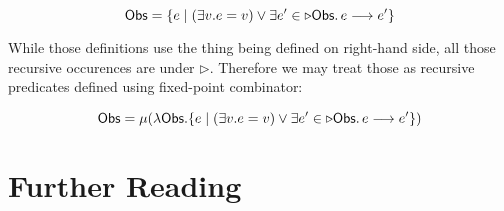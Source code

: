 \[
  \mathsf{Obs} = \{ e \mid (\exists v.e=v) \lor \exists e' \in\triangleright\mathsf{Obs} \ldotp e \longrightarrow e' \}
\]

While those definitions use the thing being defined on right-hand side, all those recursive occurences are under $\triangleright$.
Therefore we may treat those as recursive predicates defined using fixed-point combinator:

\[
  \mathsf{Obs} = \mu(\lambda \mathsf{Obs}. \{ e \mid (\exists v.e=v) \lor \exists e' \in\triangleright\mathsf{Obs} \ldotp e \longrightarrow e' \})
\]
\section{Further Reading}
